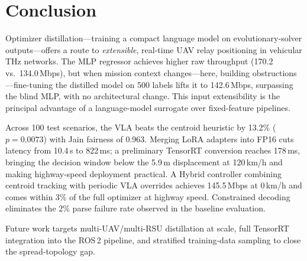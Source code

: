 \documentclass[journal]{IEEEtran}
\begin{document}
\section{Conclusion}
\label{sec:conclusion}

Optimizer distillation---training a compact language model on evolutionary-solver outputs---offers a route to \emph{extensible}, real-time UAV relay positioning in vehicular THz networks. The MLP regressor achieves higher raw throughput (170.2 vs.\ 134.0\,Mbps), but when mission context changes---here, building obstructions---fine-tuning the distilled model on 500 labels lifts it to 142.6\,Mbps, surpassing the blind MLP, with no architectural change. This input extensibility is the principal advantage of a language-model surrogate over fixed-feature pipelines.

Across 100 test scenarios, the VLA beats the centroid heuristic by 13.2\% ($p{=}0.0073$) with Jain fairness of 0.963. Merging LoRA adapters into FP16 cuts latency from 10.4\,s to 822\,ms; a preliminary TensorRT conversion reaches 178\,ms, bringing the decision window below the 5.9\,m displacement at 120\,km/h and making highway-speed deployment practical. A Hybrid controller combining centroid tracking with periodic VLA overrides achieves 145.5\,Mbps at 0\,km/h and comes within 3\% of the full optimizer at highway speed. Constrained decoding eliminates the 2\% parse failure rate observed in the baseline evaluation.

Future work targets multi-UAV/multi-RSU distillation at scale, full TensorRT integration into the ROS\,2 pipeline, and stratified training-data sampling to close the spread-topology gap.


\balance

\end{document}

